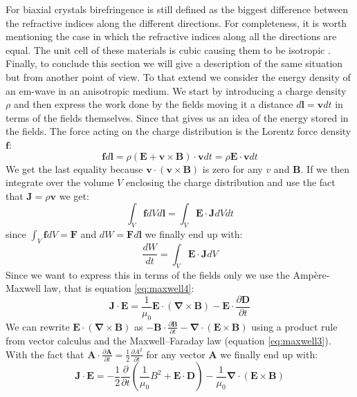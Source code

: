 For biaxial crystals birefringence is still defined as the biggest difference between the refractive indices along the different directions. For completeness, it is worth mentioning the case in which the refractive indices along all the directions are equal. The unit cell of these materials is cubic causing them to be isotropic \cite{HechtOpticsEdition}. 
Finally, to conclude this section we will give a description of the same situation but from another point of view. To that extend we consider the energy density of an em-wave in an anisotropic medium.
We start by introducing a charge density $\rho$ and then express the work done by the fields moving it a distance $d\bm{l}=\bm{v}dt$ in terms of the fields themselves. Since that gives us an idea of the energy stored in the fields. The force acting on the charge distribution is the Lorentz force density $\bm{f}$:
\begin{equation}
    \bm{f}d\bm{l}=\rho(\bm{E}+\bm{v}\times\bm{B})\cdot\bm{v}dt=\rho\bm{E}\cdot\bm{v}dt
\end{equation}
We get the last equality because $\bm{v}\cdot(\bm{v}\times\bm{B})$ is zero for any $v$ and $\bm{B}$. 
If we then integrate over the volume $V$ enclosing the charge distribution and use the fact that $\bm{J}=\rho\bm{v}$ we get:
\begin{equation}
    \int_V \bm{f} dV d\bm{l}=\int_V \bm{E}\cdot\bm{J} dVdt
\end{equation}
since $\int_V \bm{f} dV = \bm{F}$ and $dW = \bm{F} d\bm{l}$ we finally end up with:
\begin{equation}
    \label{eq:emf_work}
    \frac{dW}{dt} = \int_V \bm{E}\cdot\bm{J} dV
\end{equation}
Since we want to express this in terms of the fields only we use the Ampère-Maxwell law, that is equation \ref{eq:maxwell4}:
\begin{equation}
    \bm{J}\cdot\bm{E} = \frac{1}{\mu_0}\bm{E}\cdot(\bm{\nabla}\times\bm{B})-\bm{E}\cdot\frac{\partial\bm{D}}{\partial t}
\end{equation}
We can rewrite $\bm{E}\cdot(\bm{\nabla}\times\bm{B})$ as $-\bm{B}\cdot\frac{\partial \bm{B}}{\partial t} - \bm{\nabla}\cdot(\bm{E}\times\bm{B})$ using a product rule from vector calculus and the Maxwell–Faraday law (equation \ref{eq:maxwell3}). With the fact that $\bm{A}\cdot\frac{\partial \bm{A}}{\partial t} = \frac{1}{2} \frac{\partial A^2}{\partial t}$ for any vector $\bm{A}$ we finally end up with:
\begin{equation}
    \bm{J}\cdot\bm{E} = -\frac{1}{2}\frac{\partial}{\partial t}\left(\frac{1}{\mu_0}B^2+\bm{E}\cdot\bm{D}\right)-\frac{1}{\mu_0}\bm{\nabla}\cdot(\bm{E}\times\bm{B})
\end{equation}
